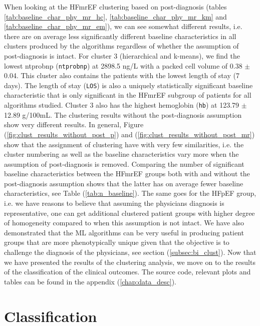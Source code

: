\documentclass[../thesis.tex]{subfiles}
\begin{document}
\indent When looking at the HFmrEF clustering based on post-diagnosis (tables \ref{tab:baseline_char_phy_mr_hc}, \ref{tab:baseline_char_phy_mr_km} and \ref{tab:baseline_char_phy_mr_em}), we can see somewhat different results, i.e. there are on average less significantly different baseline characteristics in all clusters produced by the algorithms regardless of whether the assumption of post-diagnosis is intact. For cluster 3 (hierarchical and k-means), we find the lowest ntprobnp (\texttt{ntprobnp}) at 2898.5 ng/L with a packed cell volume of 0.38 $\pm$ 0.04. This cluster also contains the patients with the lowest length of stay (7 days). The length of stay (\texttt{LOS}) is also a uniquely statistically significant baseline characteristic that is only significant in the HFmrEF subgroup of patients for all algorithms studied. Cluster 3 also has the highest hemoglobin (\texttt{hb}) at 123.79 $\pm$ 12.89 g/100mL. The clustering results without the post-diagnosis assumption show very different results. In general, Figure (\ref{fig:clust_results_without_post_p}) and (\ref{fig:clust_results_without_post_mr}) show that the assignment of clustering have with very few similarities, i.e. the cluster numbering as well as the baseline characteristics vary more when the assumption of post-diagnosis is removed. Comparing the number of significant baseline characteristics between the HFmrEF groups both with and without the post-diagnosis assumption shows that the latter has on average fewer baseline characteristics, see Table (\ref{tab:n_baseline}). The same goes for the HFpEF group, i.e. we have reasons to believe that assuming the physicians diagnosis is representative, one can get additional clustered patient groups with higher degree of homogeneity compared to when this assumption is not intact. We have also demonstrated that the ML algorithms can be very useful in producing patient groups that are more phenotypically unique given that the objective is to challenge the diagnosis of the physicians, see section (\ref{subsec:bi_clust}). Now that we have presented the results of the clustering analysis, we move on to the results of the classification of the clinical outcomes. The source code, relevant plots and tables can be found in the appendix (\ref{chap:data_desc}).

\vspace*{-0,5cm}\section{Classification}
\end{document}
